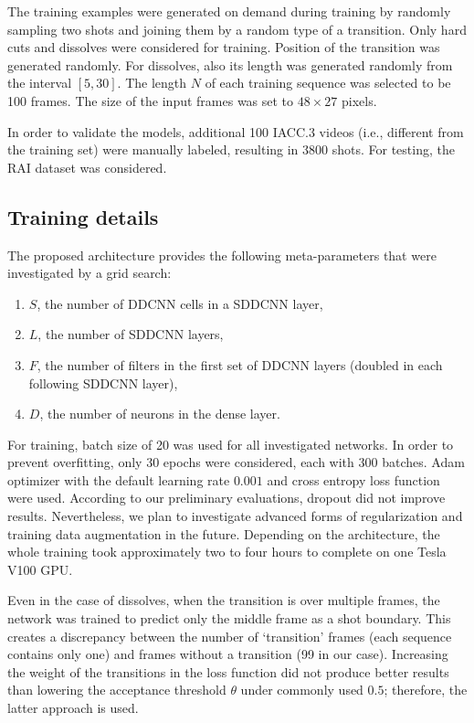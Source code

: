The training examples were generated on demand during training by randomly sampling two shots and joining them by a random type of a transition. Only hard cuts and dissolves were considered for training. Position of the transition was generated randomly. For dissolves, also its length was generated randomly from the interval $[5, 30]$. The length $N$ of each training sequence was selected to be 100 frames. The size of the input frames was set to $48\times 27$ pixels.

In order to validate the models, additional 100 IACC.3 videos (i.e., different from the training set) were manually labeled, resulting in 3800 shots. For testing, the RAI dataset \cite{Baraldi15} was considered.


\subsection{Training details}
The proposed architecture provides the following meta-parameters that were investigated by a grid search:

\begin{enumerate}
\item $S$, the number of DDCNN cells in a SDDCNN layer,
\item $L$, the number of SDDCNN layers,
\item $F$, the number of filters in the first set of DDCNN layers (doubled in each following SDDCNN layer),
\item $D$, the number of neurons in the dense layer.
\end{enumerate}

For training, batch size of 20 was used for all investigated networks. In order to prevent overfitting, only 30 epochs were  considered, each with 300 batches. Adam optimizer \cite{Adam14} with the default learning rate $0.001$ and cross entropy loss function were used. According to our preliminary evaluations, dropout did not improve results. Nevertheless, we plan to investigate advanced forms of regularization and training data augmentation in the future. Depending on the architecture, the whole training took approximately two to four hours to complete on one Tesla V100 GPU.

Even in the case of dissolves, when the transition is over multiple frames, the network was trained to predict only the middle frame as a shot boundary. This creates a discrepancy between the number of `transition' frames (each sequence contains only one) and frames without a transition (99 in our case). 
Increasing the weight of the transitions in the loss function did not produce better results than lowering the acceptance threshold $\theta$ under commonly used $0.5$; therefore, the latter approach is used.

